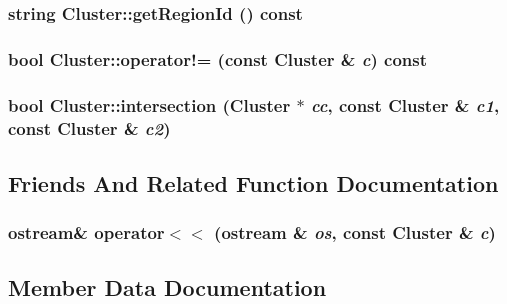 \subsubsection{\setlength{\rightskip}{0pt plus 5cm}string Cluster::getRegionId () const\hspace{0.3cm}{\tt  [inline]}}\label{structCluster_bbaa46277d1fa6e3c7e1a3b240d723ce}


\subsubsection{\setlength{\rightskip}{0pt plus 5cm}bool Cluster::operator!= (const {\bf Cluster} \& {\em c}) const\hspace{0.3cm}{\tt  [inline]}}\label{structCluster_fa0ee61e750a324e1541eb8748b5b21b}


\subsubsection{\setlength{\rightskip}{0pt plus 5cm}bool Cluster::intersection ({\bf Cluster} $\ast$ {\em cc}, const {\bf Cluster} \& {\em c1}, const {\bf Cluster} \& {\em c2})\hspace{0.3cm}{\tt  [static]}}\label{structCluster_9a4d09cf7d1a6ebd437b42ad6983f00b}




\subsection{Friends And Related Function Documentation}
\subsubsection{\setlength{\rightskip}{0pt plus 5cm}ostream\& operator$<$$<$ (ostream \& {\em os}, const {\bf Cluster} \& {\em c})\hspace{0.3cm}{\tt  [friend]}}\label{structCluster_66e4ab0733f65907e1cb0a41f9c11360}




\subsection{Member Data Documentation}
